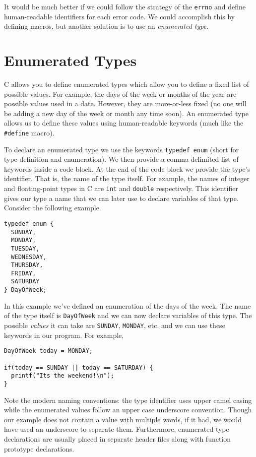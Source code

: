 It would be much better if we could follow the strategy of the
\texttt{errno} and define human-readable identifiers 
for each error code.  We could accomplish this by defining
macros, but another solution is to use an \emph{enumerated
type}.

\section{Enumerated Types}

C allows you to define \glspl{enumerated type} which allow you to
define a fixed list of possible values.  For example, the days of the
week or months of the year are possible values used in a date.
However, they are more-or-less fixed (no one will be adding a new
day of the week or month any time soon).  An enumerated type
allows us to define these values using human-readable keywords
(much like the \texttt{#define} macro).  

To declare an enumerated type we use the keywords 
\texttt{typedef enum} (short for type definition
and enumeration).  We then provide a comma delimited
list of keywords inside a code block.  At the end of the
code block we provide the type's identifier.  That is, the
name of the type itself.  For example, the names of 
integer and floating-point types in C are \texttt{int} and 
\texttt{double} respectively.  This identifier gives
our type a name that we can later use to declare variables
of that type.  Consider the following example.

\begin{verbatim}
typedef enum {
  SUNDAY,
  MONDAY,
  TUESDAY,
  WEDNESDAY,
  THURSDAY,
  FRIDAY,
  SATURDAY
} DayOfWeek;
\end{verbatim}

In this example we've defined an enumeration of the days 
of the week.  The name of the type itself is \texttt{DayOfWeek}
and we can now declare variables of this type.  The possible 
\emph{values} it can take are \texttt{SUNDAY}, 
\texttt{MONDAY}, etc. and we can use these keywords 
in our program.  For example, 

\begin{verbatim}
DayOfWeek today = MONDAY;

if(today == SUNDAY || today == SATURDAY) {
  printf("Its the weekend!\n");
}
\end{verbatim}

Note the modern naming conventions: the type identifier uses 
upper camel casing while the enumerated values follow an 
upper case underscore convention.  Though our example does
not contain a value with multiple words, if it had, we would have
used an underscore to separate them.  Furthermore, enumerated
type declarations are usually placed in separate header files
along with function prototype declarations.  

